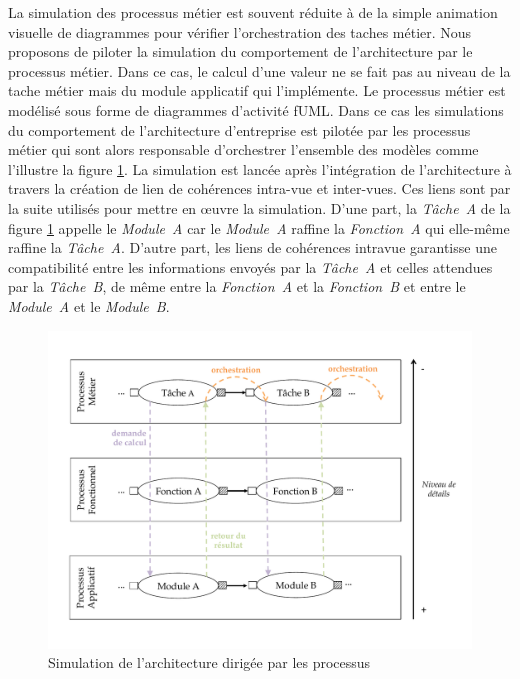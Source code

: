 La simulation des processus métier est souvent réduite à de la simple animation
visuelle de diagrammes pour vérifier l'orchestration des taches métier. Nous
proposons de piloter la simulation du comportement de l'architecture par le
processus métier. Dans ce cas, le calcul d'une valeur ne se fait pas au niveau
de la tache métier mais du module applicatif qui l'implémente. Le processus
métier est modélisé sous forme de diagrammes d'activité fUML. Dans ce cas les
simulations du comportement de l'architecture d'entreprise est pilotée par les
processus métier qui sont alors responsable d'orchestrer l'ensemble des modèles
comme l'illustre la figure \ref{fig:Simulation_Approche}. La simulation est
lancée après l'intégration de l'architecture à travers la création de lien de
cohérences intra-vue et inter-vues. Ces liens sont par la suite utilisés pour
mettre en œuvre la simulation. D'une part, la \textit{Tâche~A} de la figure
\ref{fig:Simulation_Approche} appelle le \textit{Module~A} car le
\textit{Module~A} raffine la \textit{Fonction~A} qui elle-même raffine la
\textit{Tâche~A}. D'autre part, les liens de cohérences intravue garantisse une
compatibilité entre les informations envoyés par la \textit{Tâche~A} et celles
attendues par la \textit{Tâche~B}, de même entre la \textit{Fonction~A} et la
\textit{Fonction~B} et entre le \textit{Module~A} et le \textit{Module~B}.

\begin{figure}[!ht]
\begin{center}
\includegraphics[trim= 0cm 3cm 0cm 0cm, width=1\textwidth]{figures/4_demarche/approche_simulation.pdf}
\end{center}
\caption{Simulation de l'architecture dirigée par les processus}
\label{fig:Simulation_Approche}
\end{figure}

